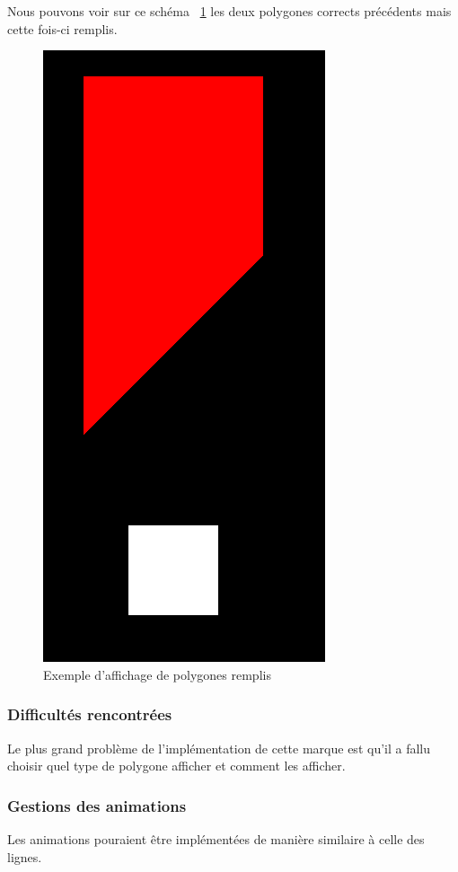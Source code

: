 \documentclass[12pt]{article}
\begin{document}
Nous pouvons voir sur ce schéma ~\ref{fig:capture_polygon_fill} les deux polygones corrects précédents mais cette fois-ci remplis.
\begin{figure}[htp]
  \centering
  \includegraphics[scale=0.5]{images/polygon_fill}
  \caption{Exemple d'affichage de polygones remplis}
  \label{fig:capture_polygon_fill}
\end{figure}

\subsubsection{Difficultés rencontrées}
Le plus grand problème de l'implémentation de cette marque est qu'il a fallu choisir quel type
de polygone afficher et comment les afficher.

\subsubsection{Gestions des animations}
Les animations pouraient être implémentées de manière similaire à celle des lignes.
\end{document}
